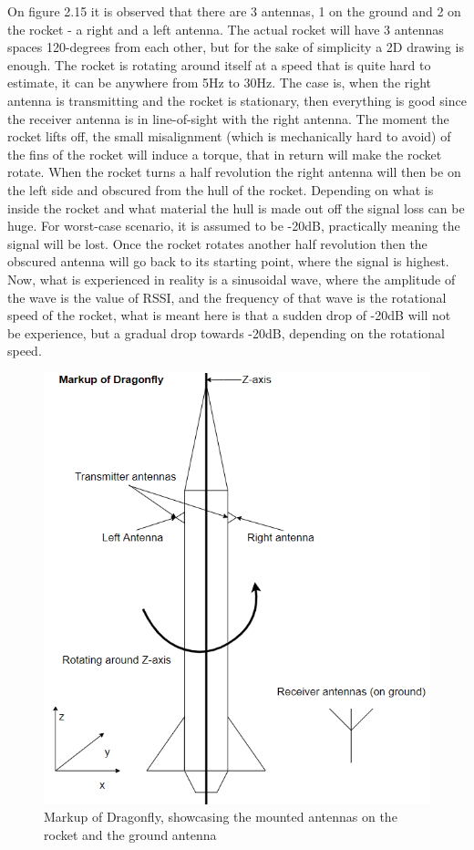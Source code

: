 On figure 2.15 it is observed that there are 3 antennas, 1 on the ground and 2 on the rocket - a right and a left antenna. The actual rocket will have 3 antennas spaces 120-degrees from each other, but for the sake of simplicity a 2D drawing is enough. The rocket is rotating around itself at a speed that is quite hard to estimate, it can be anywhere from 5Hz to 30Hz. The case is, when the right antenna is transmitting and the rocket is stationary, then everything is good since the receiver antenna is in line-of-sight with the right antenna. The moment the rocket lifts off, the small misalignment (which is mechanically hard to avoid) of the fins of the rocket will induce a torque, that in return will make the rocket rotate. When the rocket turns a half revolution the right antenna will then be on the left side and obscured from the hull of the rocket. Depending on what is inside the rocket and what material the hull is made out off the signal loss can be huge. For worst-case scenario, it is assumed to be -20dB, practically meaning the signal will be lost. Once the rocket rotates another half revolution then the obscured antenna will go back to its starting point, where the signal is highest. Now, what is experienced in reality is a sinusoidal wave, where the amplitude of the wave is the value of RSSI, and the frequency of that wave is the rotational speed of the rocket, what is meant here is that a sudden drop of -20dB will not be experience, but a gradual drop towards -20dB, depending on the rotational speed. 
\begin{figure}[h]
\centering
\includegraphics[scale=1]{figures/RocketShading.PNG}
\caption{Markup of Dragonfly, showcasing the mounted antennas on the rocket and the ground antenna}
\end{figure}

